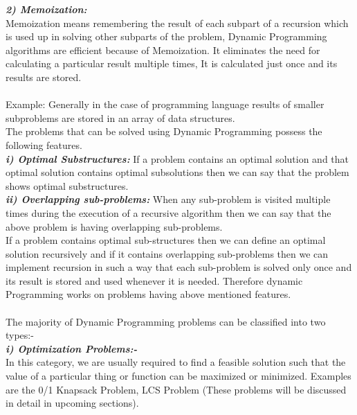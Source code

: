 \documentclass[12pt]{book}
\begin{document}
	\textbf{\textit{2)  Memoization:}}\\ Memoization means remembering the result of each subpart of a recursion which is used up in solving other subparts of the problem, Dynamic Programming algorithms are efficient because of Memoization. It eliminates the need for calculating a particular result multiple times, It is calculated just once and its results are stored.\\\\
      Example: Generally in the case of programming language results of smaller subproblems are stored in an array of data structures.\\

			The problems that can be solved using Dynamic Programming possess the following features.\\

				\textbf{\textit{i)  Optimal Substructures:}} If a problem contains an optimal solution and that optimal solution contains optimal subsolutions then we can say that the problem shows optimal substructures.\\

				\textbf{\textit{ii)  Overlapping sub-problems:}} When any sub-problem is visited multiple times during the execution of a recursive algorithm then we can say that the above problem is having overlapping sub-problems.\\

			If a problem contains optimal sub-structures then we can define an optimal solution recursively and if it contains overlapping sub-problems then we can implement recursion in such a way that each sub-problem is solved only once and its result is stored and used whenever it is needed. Therefore dynamic Programming works on problems having above mentioned features.\\\\

The majority of Dynamic Programming problems can be classified into two types:-\\

	\textbf{\textit{i)  Optimization Problems:-}}\\
In this category, we are usually required to find a feasible solution such that the value of a particular thing or function can be maximized or minimized.
Examples are the 0/1 Knapsack Problem, LCS Problem (These problems will be discussed in detail in upcoming sections).\\\\
\end{document}
